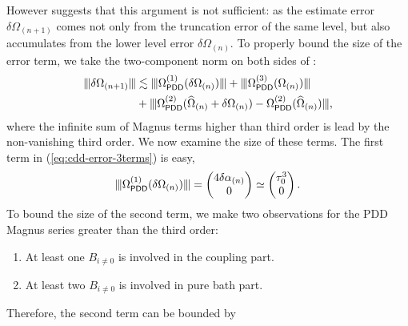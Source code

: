 \documentclass[pra,reprint,superscriptaddress]{revtex4-2}
\newcommand{\Opdd}{\Omega_{\mathsf{PDD}}}
\begin{document}
{However  suggests that this argument is not sufficient: as
the estimate error $\delta\Omega_{(n+1)}$ comes not only  from the truncation error of the same level, but also accumulates from the lower level error $\delta\Omega_{(n)}$. 
To properly bound the size of the error term, we take the two-component norm on both sides of :
\begin{equation}
\begin{aligned}\label{eq:cdd-error-3terms}
\opnorm{\delta\Omega_{(n+1)} }
&\lesssim \opnorm{ \Opdd\up{1}(\delta\Omega_{(n)}) } + 
\opnorm{\Opdd\up{3}( \Omega_{(n)})} \\
&+ \opnorm{ \Opdd\up{2}(\Ohat_{(n)}+\delta\Omega_{(n)})-\Opdd\up{2}(\Ohat_{(n)})},
\end{aligned}    
\end{equation}
where the infinite sum of Magnus terms higher than third order is lead by the non-vanishing third order. 
We now examine the size of these terms.
The first term in (\ref{eq:cdd-error-3terms}) is easy,
\begin{equation*}
\opnorm{\Opdd\up{1}(\delta\Omega_{(n)})} = \begin{pmatrix}
4 \delta\alpha_{(n)} \\
0
\end{pmatrix}\simeq
\begin{pmatrix}
\Dt^3 \\
0
\end{pmatrix}.
\end{equation*}
To bound the size of the second term, we make two observations for the PDD Magnus series greater than the third order:
\begin{enumerate}
    \item At least one $B_{i\neq0}$ is involved in the coupling part.
    \item At least two $B_{i\neq 0}$ is involved in pure bath part.  
\end{enumerate}
Therefore, the second term can be bounded by
\begin{equation*}

\end{equation*}}
\end{document}
